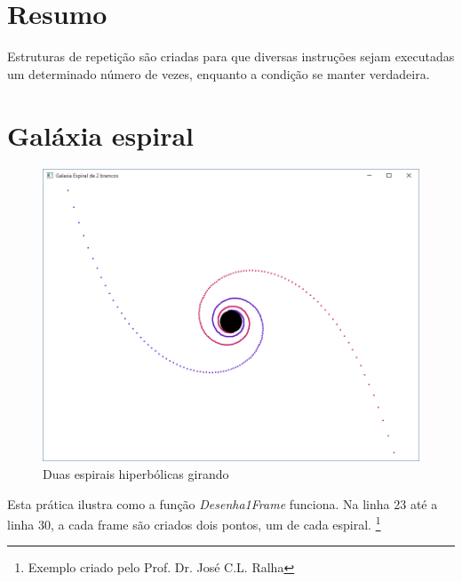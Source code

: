\section{Resumo}

Estruturas de repetição são criadas para que diversas instruções sejam executadas um determinado número de vezes, enquanto a condição se manter verdadeira.


%
%







\section{Galáxia espiral}
\begin{figure}[ht]
  \centerline{\includegraphics[width=.5\textwidth]{img/cap1_ex6.png}}
  \caption{Duas espirais hiperbólicas girando}
  \label{fig:cap01_ex6}
\end{figure}
Esta prática ilustra como a função \emph{Desenha1Frame} funciona. Na linha 23 até a linha 30, a cada frame são criados dois pontos, um de cada espiral. \footnote{Exemplo criado pelo Prof. Dr. José C.L. Ralha}


